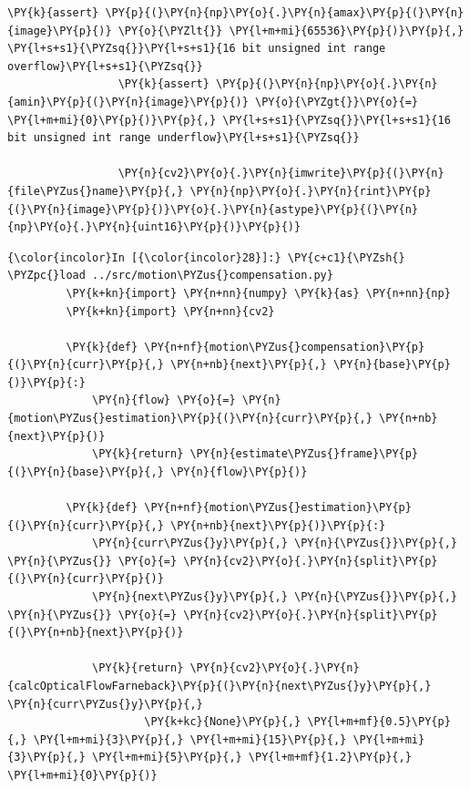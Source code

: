 {\begin{Verbatim}[commandchars=\\\{\}]
                 \PY{k}{assert} \PY{p}{(}\PY{n}{np}\PY{o}{.}\PY{n}{amax}\PY{p}{(}\PY{n}{image}\PY{p}{)} \PY{o}{\PYZlt{}} \PY{l+m+mi}{65536}\PY{p}{)}\PY{p}{,} \PY{l+s+s1}{\PYZsq{}}\PY{l+s+s1}{16 bit unsigned int range overflow}\PY{l+s+s1}{\PYZsq{}}
                 \PY{k}{assert} \PY{p}{(}\PY{n}{np}\PY{o}{.}\PY{n}{amin}\PY{p}{(}\PY{n}{image}\PY{p}{)} \PY{o}{\PYZgt{}}\PY{o}{=} \PY{l+m+mi}{0}\PY{p}{)}\PY{p}{,} \PY{l+s+s1}{\PYZsq{}}\PY{l+s+s1}{16 bit unsigned int range underflow}\PY{l+s+s1}{\PYZsq{}}
                 
                 \PY{n}{cv2}\PY{o}{.}\PY{n}{imwrite}\PY{p}{(}\PY{n}{file\PYZus{}name}\PY{p}{,} \PY{n}{np}\PY{o}{.}\PY{n}{rint}\PY{p}{(}\PY{n}{image}\PY{p}{)}\PY{o}{.}\PY{n}{astype}\PY{p}{(}\PY{n}{np}\PY{o}{.}\PY{n}{uint16}\PY{p}{)}\PY{p}{)}
\end{Verbatim}


    \begin{Verbatim}[commandchars=\\\{\}]
{\color{incolor}In [{\color{incolor}28}]:} \PY{c+c1}{\PYZsh{} \PYZpc{}load ../src/motion\PYZus{}compensation.py}
         \PY{k+kn}{import} \PY{n+nn}{numpy} \PY{k}{as} \PY{n+nn}{np}
         \PY{k+kn}{import} \PY{n+nn}{cv2}
         
         \PY{k}{def} \PY{n+nf}{motion\PYZus{}compensation}\PY{p}{(}\PY{n}{curr}\PY{p}{,} \PY{n+nb}{next}\PY{p}{,} \PY{n}{base}\PY{p}{)}\PY{p}{:}
             \PY{n}{flow} \PY{o}{=} \PY{n}{motion\PYZus{}estimation}\PY{p}{(}\PY{n}{curr}\PY{p}{,} \PY{n+nb}{next}\PY{p}{)}
             \PY{k}{return} \PY{n}{estimate\PYZus{}frame}\PY{p}{(}\PY{n}{base}\PY{p}{,} \PY{n}{flow}\PY{p}{)}
         
         \PY{k}{def} \PY{n+nf}{motion\PYZus{}estimation}\PY{p}{(}\PY{n}{curr}\PY{p}{,} \PY{n+nb}{next}\PY{p}{)}\PY{p}{:}
             \PY{n}{curr\PYZus{}y}\PY{p}{,} \PY{n}{\PYZus{}}\PY{p}{,} \PY{n}{\PYZus{}} \PY{o}{=} \PY{n}{cv2}\PY{o}{.}\PY{n}{split}\PY{p}{(}\PY{n}{curr}\PY{p}{)}
             \PY{n}{next\PYZus{}y}\PY{p}{,} \PY{n}{\PYZus{}}\PY{p}{,} \PY{n}{\PYZus{}} \PY{o}{=} \PY{n}{cv2}\PY{o}{.}\PY{n}{split}\PY{p}{(}\PY{n+nb}{next}\PY{p}{)}
         
             \PY{k}{return} \PY{n}{cv2}\PY{o}{.}\PY{n}{calcOpticalFlowFarneback}\PY{p}{(}\PY{n}{next\PYZus{}y}\PY{p}{,} \PY{n}{curr\PYZus{}y}\PY{p}{,} 
                     \PY{k+kc}{None}\PY{p}{,} \PY{l+m+mf}{0.5}\PY{p}{,} \PY{l+m+mi}{3}\PY{p}{,} \PY{l+m+mi}{15}\PY{p}{,} \PY{l+m+mi}{3}\PY{p}{,} \PY{l+m+mi}{5}\PY{p}{,} \PY{l+m+mf}{1.2}\PY{p}{,} \PY{l+m+mi}{0}\PY{p}{)}
         

\end{Verbatim}}
